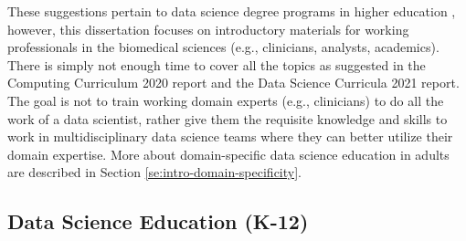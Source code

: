 \documentclass[010-intro.tex]{subfiles}
\begin{document}
    These suggestions pertain to data science degree programs in higher education
    \cite{cc2020, ccdsc2021},
    however, this dissertation focuses on introductory materials for working professionals in the biomedical sciences
    (e.g., clinicians, analysts, academics).
    There is simply not enough time to cover all the topics as suggested in the
    Computing Curriculum 2020 report and the Data Science Curricula 2021 report.
    The goal is not to train working domain experts (e.g., clinicians) to do all the work of a data scientist,
    rather give them the requisite knowledge and skills to work in multidisciplinary data science teams
    where they can better utilize their domain expertise.
    More about domain-specific data science education in adults are described in Section \ref{se:intro-domain-specificity}.

    
\subsection{Data Science Education (K-12)}
\end{document}

